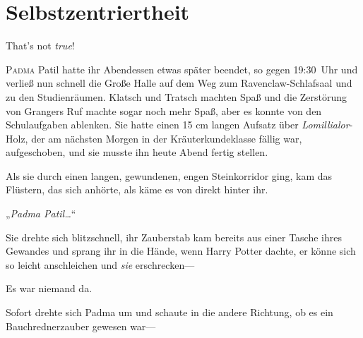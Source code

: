 \chapter{Selbstzentriertheit}

That’s not \emph{true}!

\lettrine{P}{adma} Patil hatte ihr Abendessen etwas später beendet, so gegen 19:30~Uhr und verließ nun schnell die Große Halle auf dem Weg zum Ravenclaw-Schlafsaal und zu den Studienräumen. Klatsch und Tratsch machten Spaß und die Zerstörung von Grangers Ruf machte sogar noch mehr Spaß, aber es konnte von den Schulaufgaben ablenken. Sie hatte einen 15 cm langen Aufsatz über \emph{Lomillialor}-Holz, der am nächsten Morgen in der Kräuterkundeklasse fällig war, aufgeschoben, und sie musste ihn heute Abend fertig stellen.

Als sie durch einen langen, gewundenen, engen Steinkorridor ging, kam das Flüstern, das sich anhörte, als käme es von direkt hinter ihr.

„\emph{Padma Patil…}“

Sie drehte sich blitzschnell, ihr Zauberstab kam bereits aus einer Tasche ihres Gewandes und sprang ihr in die Hände, wenn Harry Potter dachte, er könne sich so leicht anschleichen und \emph{sie} erschrecken—

Es war niemand da.

Sofort drehte sich Padma um und schaute in die andere Richtung, ob es ein Bauchrednerzauber gewesen war—

